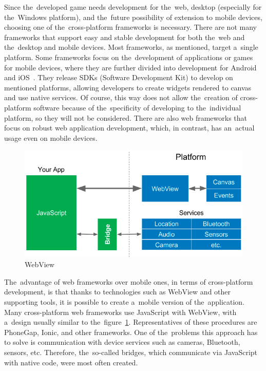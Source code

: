 Since the~developed game needs development for the~web, desktop (especially for the~Windows platform), and the~future possibility of extension to mobile devices, choosing one of the~cross-platform frameworks is necessary.
There are not many frameworks that support easy and stable development for both the~web and the~desktop and mobile devices.
Most frameworks, as mentioned, target a~single platform.
Some frameworks focus on the~development of applications or games for mobile devices, where they are further divided into development for Android and iOS~\cite{leler_2017_whats}.
They release SDKs (Software Development Kit) to develop on mentioned platforms, allowing developers to create widgets rendered to canvas and use native services.
Of course, this way does not allow the~creation of cross-platform software because of the~specificity of developing to the~individual platform, so they will not be considered.
There are also web frameworks that focus on robust web application development, which, in contrast, has an~actual usage even on mobile devices.

\begin{figure}
    \centering
    \includegraphics[width=1\linewidth]{assets/design/webview.png}
    \caption{WebView~\cite{leler_2017_whats}}
    \label{fig:design:webview}
\end{figure}

The~advantage of web frameworks over mobile ones, in terms of cross-platform development, is that thanks to technologies such as WebView and other supporting tools, it is possible to create a~mobile version of the~application.
Many cross-platform web frameworks use JavaScript with WebView, with a~design usually similar to the~figure~\ref{fig:design:webview}.
Representatives of these procedures are PhoneGap, Ionic, and other frameworks.
One of the~problems this approach has to solve is communication with device services such as cameras, Bluetooth, sensors, etc.
Therefore, the~so-called bridges, which communicate via JavaScript with native code, were most often created.

